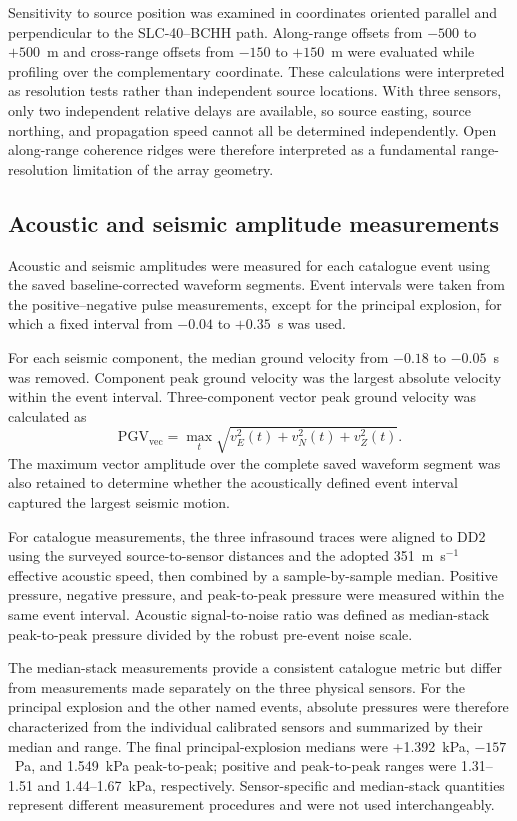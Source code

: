 \documentclass[]{seismica}
\begin{document}
Sensitivity to source position was examined in coordinates oriented parallel and perpendicular to the SLC-40--BCHH path. Along-range offsets from $-500$ to $+500$~m and cross-range offsets from $-150$ to $+150$~m were evaluated while profiling over the complementary coordinate. These calculations were interpreted as resolution tests rather than independent source locations. With three sensors, only two independent relative delays are available, so source easting, source northing, and propagation speed cannot all be determined independently. Open along-range coherence ridges were therefore interpreted as a fundamental range-resolution limitation of the array geometry.

\subsection{Acoustic and seismic amplitude measurements}

Acoustic and seismic amplitudes were measured for each catalogue event using
the saved baseline-corrected waveform segments. Event intervals were taken from
the positive--negative pulse measurements, except for the principal explosion,
for which a fixed interval from $-0.04$ to $+0.35$~s was used.

For each seismic component, the median ground velocity from $-0.18$ to $-0.05$~s was removed. Component peak ground velocity was the largest absolute velocity within the event interval. Three-component vector peak ground velocity was calculated as
\begin{equation}
  \mathrm{PGV}_{\mathrm{vec}} = \max_t\sqrt{v_E^2(t)+v_N^2(t)+v_Z^2(t)}.
  \label{eq:vector_pgv}
\end{equation}
The maximum vector amplitude over the complete saved waveform segment was also retained to determine whether the acoustically defined event interval captured the largest seismic motion.

For catalogue measurements, the three infrasound traces were aligned to DD2
using the surveyed source-to-sensor distances and the adopted
351~m~s$^{-1}$ effective acoustic speed, then combined by a sample-by-sample
median. Positive pressure, negative pressure, and peak-to-peak pressure were
measured within the same event interval. Acoustic signal-to-noise ratio was
defined as median-stack peak-to-peak pressure divided by the robust pre-event
noise scale.

The median-stack measurements provide a consistent catalogue metric but differ
from measurements made separately on the three physical sensors. For the
principal explosion and the other named events, absolute pressures were
therefore characterized from the individual calibrated sensors and summarized
by their median and range. The final principal-explosion medians were
+1.392~kPa, $-157$~Pa, and 1.549~kPa peak-to-peak; positive and peak-to-peak
ranges were 1.31--1.51 and 1.44--1.67~kPa, respectively. Sensor-specific and
median-stack quantities represent different measurement procedures and were
not used interchangeably.
\end{document}
